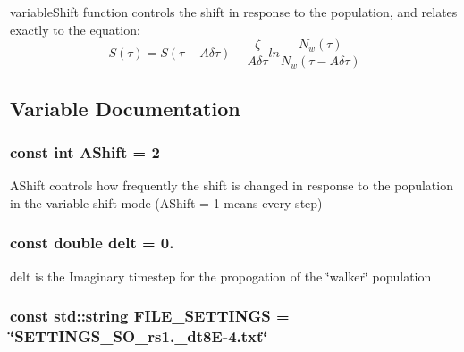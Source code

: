 variable\-Shift function controls the shift in response to the population, and relates exactly to the equation\-: \[ S(\tau) = S(\tau - A\delta \tau) - \frac{\zeta}{A \delta \tau} ln\frac{N_w (\tau)}{N_w (\tau - A\delta \tau)} \] 

\subsection{Variable Documentation}
\hypertarget{UEG__MAIN__binarytest_8C_a1b1b50ff28122bf25bbd141938893243}{
\subsubsection[{A\-Shift}]{\setlength{\rightskip}{0pt plus 5cm}const int A\-Shift = 2}}\label{UEG__MAIN__binarytest_8C_a1b1b50ff28122bf25bbd141938893243}
A\-Shift controls how frequently the shift is changed in response to the population in the variable shift mode (A\-Shift = 1 means every step) \hypertarget{UEG__MAIN__binarytest_8C_aa06f5594efa32a5569766c36690b4a22}{
\subsubsection[{delt}]{\setlength{\rightskip}{0pt plus 5cm}const double delt = 0.}}\label{UEG__MAIN__binarytest_8C_aa06f5594efa32a5569766c36690b4a22}
delt is the Imaginary timestep for the propogation of the \char`\"{}walker\char`\"{} population \hypertarget{UEG__MAIN__binarytest_8C_aa87b0f6d11261495ace185e6d5fcdcb5}{
\subsubsection[{F\-I\-L\-E\-\_\-\-S\-E\-T\-T\-I\-N\-G\-S}]{\setlength{\rightskip}{0pt plus 5cm}const std\-::string F\-I\-L\-E\-\_\-\-S\-E\-T\-T\-I\-N\-G\-S = \char`\"{}S\-E\-T\-T\-I\-N\-G\-S\-\_\-S\-O\-\_\-rs1.\-\_\-dt8\-E-\/4.txt\char`\"{}}}\label{UEG__MAIN__binarytest_8C_aa87b0f6d11261495ace185e6d5fcdcb5}
